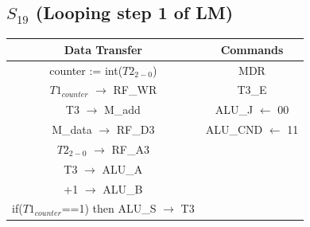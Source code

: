 \documentclass[]{report}
\begin{document}
            \subsection*{$S_{19}$ (Looping step 1 of LM)} %
            \begin{center}
                \begin{tabular}{|c|c|}
                    \hline
                    Data Transfer & Commands \\
                    \hline
                    counter := int($T2_{2-0}$) & MDR\\
                    $T1_{counter}$ $\to$ RF\_WR & T3\_E\\
                    T3 $\to$ M\_add & ALU\_J $\leftarrow$ 00\\
                    M\_data $\to$ RF\_D3 & ALU\_CND $\leftarrow$ 11\\
                    $T2_{2-0}$ $\to$ RF\_A3 & \\
                    T3 $\to$ ALU\_A & \\
                    +1 $\to$ ALU\_B & \\
                    if($T1_{counter}$==1) then ALU\_S $\to$ T3& \\
                    \hline
                \end{tabular}
            \end{center} 
\end{document}
